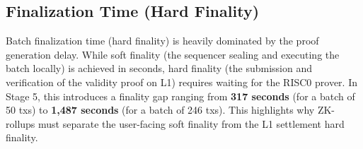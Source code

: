 \subsection{Finalization Time (Hard Finality)}
Batch finalization time (hard finality) is heavily dominated by the proof generation delay. While soft finality (the sequencer sealing and executing the batch locally) is achieved in seconds, hard finality (the submission and verification of the validity proof on L1) requires waiting for the RISC0 prover. In Stage 5, this introduces a finality gap ranging from \textbf{317 seconds} (for a batch of 50 txs) to \textbf{1,487 seconds} (for a batch of 246 txs). This highlights why ZK-rollups must separate the user-facing soft finality from the L1 settlement hard finality.
